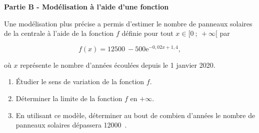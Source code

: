 \documentclass[10pt]{article}
\providecommand{\e}{{\mathrm{e}}}
\providecommand{\np}[2][]{{#2~#1}}
\begin{document}
\bigskip

\textbf{Partie B - Modélisation à l'aide d'une fonction}

\medskip

Une modélisation plus précise a permis d'estimer le nombre de panneaux solaires de la centrale à l'aide de la fonction $f$ définie pour tout $x \in [0~;~ +\infty[$ par 

\[f(x) = \np{12500} - 500 \e^{-0,02x+1,4},\]

 où $x$ représente le nombre d'années écoulées depuis le 1 janvier 2020.

\medskip

\begin{enumerate}
\item Étudier le sens de variation de la fonction $f$.
\item Déterminer la limite de la fonction $f$ en $+\infty$.
\item En utilisant ce modèle, déterminer au bout de combien d'années le nombre de panneaux
solaires dépassera \np{12000}.
\end{enumerate}

\bigskip
\end{document}
